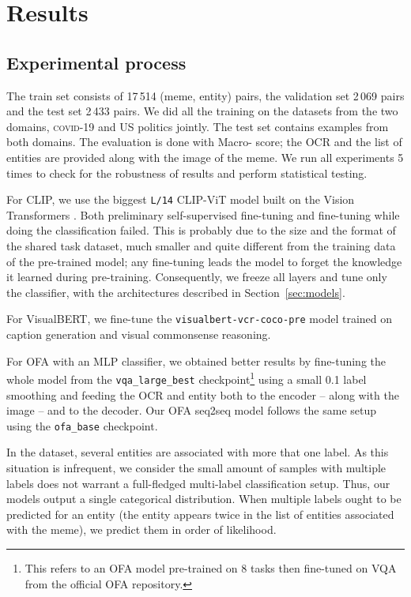 \section{Results}
\label{sec:results}

\subsection{Experimental process}
The train set consists of 17\,514 (meme, entity) pairs, the validation set 2\,069 pairs and the test set 2\,433 pairs. We did all the training on the datasets from the two domains, \textsc{covid}-19 and US politics jointly. The test set contains examples from both domains.
The evaluation is done with Macro-\fone{} score; the OCR and the list of entities are provided along with the image of the meme. We run all experiments 5 times to check for the robustness of results and perform statistical testing.


For CLIP, we use the biggest \texttt{L/14} CLIP-ViT model built on the Vision Transformers \cite{dosovitskiy2020image}. Both preliminary self-supervised fine-tuning and fine-tuning while doing the classification failed. This is probably due to the size and the format of the shared task dataset, much smaller and quite different from the training data of the pre-trained model; any fine-tuning leads the model to forget the knowledge it learned during pre-training. Consequently, we freeze all layers and tune only the classifier, with the architectures described in Section~\ref{sec:models}.  

For VisualBERT, we fine-tune the \texttt{visualbert-vcr-coco-pre} model trained on caption generation and visual commonsense reasoning.

For OFA \encoder[pool] with an MLP classifier, we obtained better results by fine-tuning the whole model from the \texttt{vqa\_large\_best} checkpoint\footnote{This refers to an OFA model pre-trained on 8 tasks then fine-tuned on VQA from the official OFA repository.} using a small 0.1 label smoothing and feeding the OCR and entity both to the encoder -- along with the image -- and to the decoder.
Our OFA seq2seq model follows the same setup using the \texttt{ofa\_base} checkpoint.

In the dataset, several entities are associated with more that one label.
As this situation is infrequent, we consider the small amount of samples with multiple labels does not warrant a full-fledged multi-label classification setup.
Thus, our models output a single categorical distribution. When multiple labels ought to be predicted for an entity (the entity appears twice in the list of entities associated with the meme), we predict them in order of likelihood.


